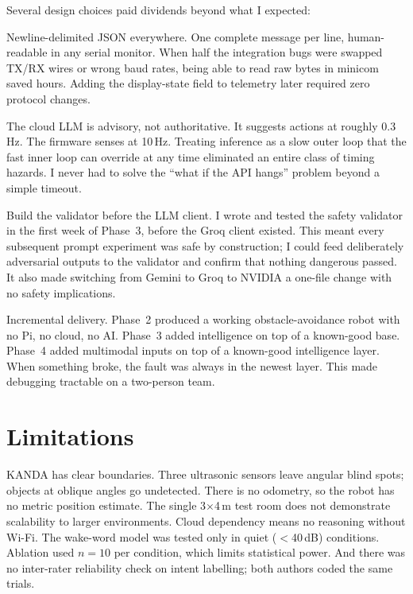 Several design choices paid dividends beyond what I expected:

Newline-delimited JSON everywhere. One complete message per line, human-readable in any serial monitor. When half the integration bugs were swapped TX/RX wires or wrong baud rates, being able to read raw bytes in minicom saved hours. Adding the display-state field to telemetry later required zero protocol changes.

The cloud LLM is advisory, not authoritative. It suggests actions at roughly 0.3\,Hz. The firmware senses at 10\,Hz. Treating inference as a slow outer loop that the fast inner loop can override at any time eliminated an entire class of timing hazards. I never had to solve the ``what if the API hangs'' problem beyond a simple timeout.


Build the validator before the LLM client. I wrote and tested the safety validator in the first week of Phase~3, before the Groq client existed. This meant every subsequent prompt experiment was safe by construction; I could feed deliberately adversarial outputs to the validator and confirm that nothing dangerous passed. It also made switching from Gemini to Groq to NVIDIA a one-file change with no safety implications.


Incremental delivery. Phase~2 produced a working obstacle-avoidance robot with no Pi, no cloud, no AI. Phase~3 added intelligence on top of a known-good base. Phase~4 added multimodal inputs on top of a known-good intelligence layer. When something broke, the fault was always in the newest layer. This made debugging tractable on a two-person team.

\section{Limitations}
\label{sec:limitations}

KANDA has clear boundaries. Three ultrasonic sensors leave angular blind spots; objects at oblique angles go undetected. There is no odometry, so the robot has no metric position estimate. The single 3$\times$4\,m test room does not demonstrate scalability to larger environments. Cloud dependency means no reasoning without Wi-Fi. The wake-word model was tested only in quiet ($<$40\,dB) conditions. Ablation used $n{=}10$ per condition, which limits statistical power. And there was no inter-rater reliability check on intent labelling; both authors coded the same trials.


